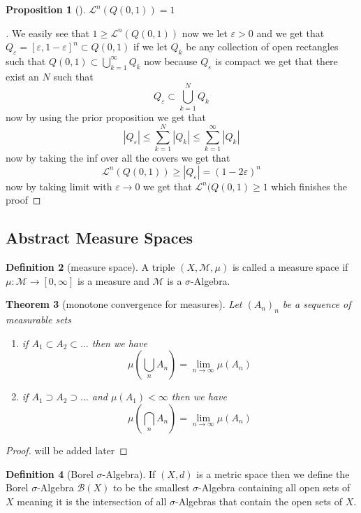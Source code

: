 \documentclass[11pt,a4paper]{article}
\newcommand{\cB}{\mathcal{B}}
\newcommand{\cM}{\mathcal{M}}
\newcommand{\cL}{\mathcal{L}}
\theoremstyle{plain}
\newtheorem{theorem}{Theorem}[section]
\newtheorem{proposition}[theorem]{Proposition}
\theoremstyle{definition}
\newtheorem{definition}[theorem]{Definition}
\begin{document}
\begin{proposition}[]
    $\cL^n(Q(0, 1)) = 1$
\end{proposition}
\begin{proof}[]
    We easily see that $1 \ge \cL^n(Q(0, 1))$ now we let $\varepsilon > 0$ 
    and we get that $Q_\varepsilon = [\varepsilon, 1 - \varepsilon]^n \subset Q(0, 1)$ if we let 
    $Q_k$ be any collection of open rectangles such that $Q(0, 1) \subset \bigcup_{k=1}^\infty Q_k$
    now because $Q_\varepsilon$ is compact we get that there exist an $N$ such that 
    \[
        Q_\varepsilon \subset \bigcup_{k=1}^N Q_k
    \]
    now by using the prior proposition we get that 
    \[
        |Q_\varepsilon| \le \sum_{k=1}^N |Q_k| \le \sum_{k=1}^\infty |Q_k|
    \]
    now by taking the inf over all the covers we get that 
    \[
    \cL^n(Q(0, 1)) \ge |Q_\varepsilon| = (1 - 2\varepsilon)^n
    \]
    now by taking limit with $\varepsilon \to 0$ we get that 
    $\cL^n(Q(0, 1) \ge 1$ which finishes the proof
\end{proof}


\newpage
\subsection{Abstract Measure Spaces}

\begin{definition}[measure space]
    A triple $(X, \cM, \mu)$ is called a measure space if $\mu: \cM \to [0, \infty]$ is a measure 
    and $\cM$ is a $\sigma$-Algebra. 
\end{definition}

\begin{theorem}[monotone convergence for measures]
    Let $(A_n)_n$ be a sequence of measurable sets
    \begin{enumerate}
        \item if $A_1 \subset A_2 \subset \dots$ then we have 
            \[
                \mu(\bigcup_n A_n) = \lim_{n \to \infty} \mu(A_n)
            \]
        \item if $A_1 \supset A_2 \supset \dots$ and $\mu(A_1) < \infty$ then we have 
            \[
                \mu(\bigcap_n A_n) = \lim_{n \to \infty} \mu(A_n)
            \]
    \end{enumerate}
\end{theorem}
\begin{proof}
    will be added later
\end{proof}

\begin{definition}[Borel $\sigma$-Algebra]
    If $(X, d)$ is a metric space then we define the Borel $\sigma$-Algebra $\cB(X)$
    to be the smallest $\sigma$-Algebra containing all open sets of $X$ meaning 
    it is the intersection of all $\sigma$-Algebras that contain the open sets of $X$.
\end{definition}
\end{document}
